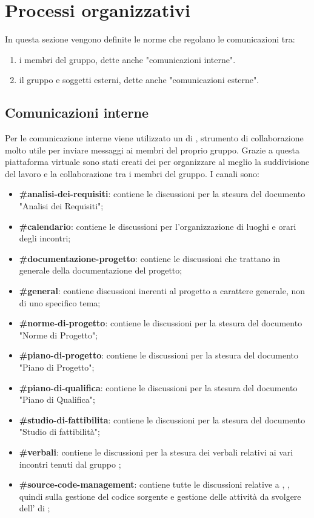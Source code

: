\section{Processi organizzativi}
In questa sezione vengono definite le norme che regolano le comunicazioni tra:
\begin{enumerate}
	\item i membri del gruppo, dette anche "comunicazioni interne".
	\item il gruppo e soggetti esterni, dette anche "comunicazioni esterne".
\end{enumerate}
	
\subsection{Comunicazioni interne}
Per le comunicazione interne viene utilizzato un  di ,
strumento di collaborazione molto utile per inviare messaggi ai membri del proprio gruppo.
Grazie a questa piattaforma virtuale sono stati creati dei  per organizzare al meglio la suddivisione del lavoro e la collaborazione tra i membri del gruppo.
I canali sono:
\begin{itemize}
	\item \textbf{\#analisi-dei-requisiti}: contiene le discussioni per la stesura del documento "Analisi dei Requisiti";
	\item \textbf{\#calendario}: contiene le discussioni per l’organizzazione di luoghi e orari degli incontri;
	\item \textbf{\#documentazione-progetto}: contiene le discussioni che trattano in generale della documentazione del progetto;
	\item \textbf{\#general}: contiene discussioni inerenti al progetto a carattere generale, non di uno specifico tema;
	\item \textbf{\#norme-di-progetto}: contiene le discussioni per la stesura del documento "Norme di Progetto";
    \item \textbf{\#piano-di-progetto}: contiene le discussioni per la stesura del documento "Piano di Progetto";
	\item \textbf{\#piano-di-qualifica}: contiene le discussioni per la stesura del documento "Piano di Qualifica";
	\item \textbf{\#studio-di-fattibilita}: contiene le discussioni per la stesura del documento "Studio di fattibilità";
	\item \textbf{\#verbali}: contiene le discussioni per la stesura dei verbali relativi ai vari incontri tenuti dal gruppo \Gruppo;
	\item \textbf{\#source-code-management}: contiene tutte le discussioni relative a , , quindi sulla gestione del codice sorgente e gestione delle attività da svolgere dell' di ;
\end{itemize}

